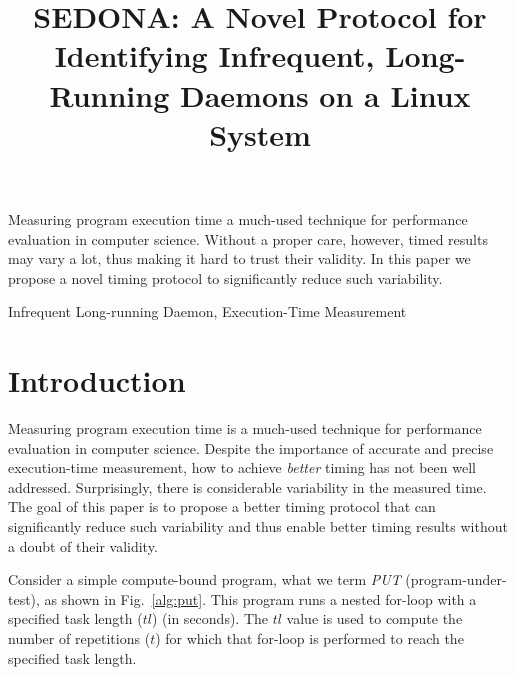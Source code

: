 \documentclass[letter]{ieice}
\title{SEDONA: A Novel Protocol for Identifying Infrequent, Long-Running Daemons on a Linux System}
\begin{document}
\maketitle

\begin{summary}
{\color{blue}Measuring program execution time 
a \hbox{much-used} technique for performance evaluation in computer science. 
Without a proper care, however, timed results may vary a lot, 
thus making it hard to trust their validity. 
In this paper we propose a novel timing protocol to significantly 
reduce such variability.}

\end{summary}
\begin{keywords}
Infrequent Long-running Daemon, Execution-Time Measurement
\end{keywords}

\section{Introduction}
\label{sec:intro}

Measuring program execution time is a much-used
technique for performance evaluation in computer science. 
Despite the importance of accurate and precise execution-time measurement, 
how to achieve {\em better} timing has not been well addressed. 
{\color{blue} Surprisingly, there is considerable variability in the measured time.
The goal of this paper is to propose
a better timing protocol that can significantly reduce such variability 
and thus enable better timing results without a doubt of their validity.}

Consider a simple compute-bound program, what we term {\em PUT} (program-under-test), 
as shown in Fig.~\ref{alg:put}. 
This program runs a nested for-loop with a specified task length ($tl$) (in seconds). 
{\color{blue}The $tl$ value is used to compute 
the number of repetitions ($t$) for which that for-loop is performed 
to reach the specified task length.}
\end{document}
